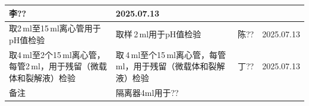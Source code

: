 \documentclass[UTF8,10pt,a4paper,fontset=fandol]{ctexart}
\newcommand{\fieldvalue}[1]{#1}
\newcommand{\handwritten}[1]{#1}
\begin{document}
\begin{tabularx}{\textwidth}{|p{2.5cm}|X|p{2.5cm}|X|}
\fieldvalue{\handwritten{李??}} &
\fieldvalue{\handwritten{2025.07.13}}
\\ \hline
取2\,ml至15\,ml离心管用于pH值检验 &
取样\underline{\hspace{0.5cm}}\,2\,ml用于pH值检验 &
\fieldvalue{\handwritten{陈??}} &
\fieldvalue{\handwritten{2025.07.13}}
\\ \hline
取4\,ml至2个15\,ml离心管，每管2\,ml，用于残留（微载体和裂解液）检验 &
取\underline{\hspace{0.5cm}}\,4\,ml至\underline{\hspace{0.5cm}}个15\,ml离心管，每管\underline{\hspace{0.5cm}}\,ml，用于残留（微载体和裂解液）检验 &
\fieldvalue{\handwritten{丁??}} &
\fieldvalue{\handwritten{2025.07.13}}
\\ \hline
备注 &
\multicolumn{3}{l|}{
\fieldvalue{\handwritten{隔离器4ml用于??}}
}\\ \hline
\end{tabularx}

\vspace{0.5em}
\end{document}
